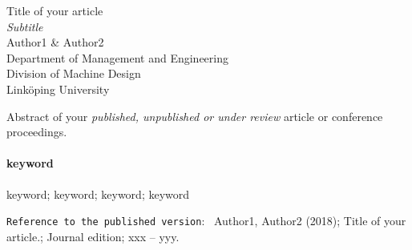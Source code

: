 
\begin{titlepage} %
\begin{flushright}{     
 {\fontsize{40}{60}\selectfont \textcolor{halfgray}{}} %
 }
\end{flushright}
\vspace{1.0cm}

	\begin{center}
	
	\setlength{\unitlength}{0.6\textwidth} %
	{\Huge Title of your article}\\[\baselineskip] %
	{\huge\textit{Subtitle}}\\[\baselineskip] %
 
		{\large Author1 \&  Author2} \\[\baselineskip] %
		{Department of Management and Engineering \\ Division of Machine Design \\ Link\"{o}ping University  }\\[\baselineskip]
	
	
\end{center}
 	



 	 			\begin{mdframed}[style=sidebar,frametitle={Abstract: }]  
Abstract of your \textit{published, unpublished or under review} article or conference proceedings.
  
\paragraph{keyword} keyword; keyword; keyword; keyword 

 \end{mdframed} 
 
   \hfill\vfill
   	\begin{flushbottom}

\noindent\texttt{Reference to the published version}: \newline ~{{Author1, Author2 (2018); Title of your article.; Journal edition; xxx -- yyy.}} 

\end{flushbottom}
\end{titlepage}
			
			
			
			
 
 \setcounter{tocdepth}{2} %

 
 \hfill\vfill

		\begin{flushbottom}
\tableofcontents
\end{flushbottom}

